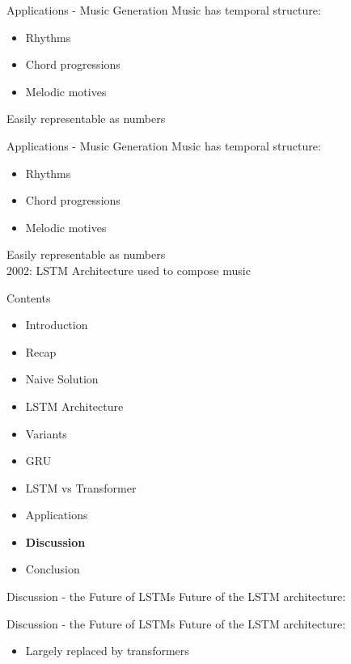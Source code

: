 \documentclass[10pt, aspectratio=169]{beamer}
\begin{document}
\begin{frame}[t]{Applications - Music Generation}
Music has temporal structure:
\begin{itemize}
    \item Rhythms
    \item Chord progressions
    \item Melodic motives
\end{itemize}
Easily representable as numbers
\end{frame}

\begin{frame}[t]{Applications - Music Generation}
Music has temporal structure:
\begin{itemize}
    \item Rhythms
    \item Chord progressions
    \item Melodic motives
\end{itemize}
Easily representable as numbers\\
2002: LSTM Architecture used to compose music
\end{frame}

\begin{frame}[t]{Contents}
\begin{itemize}
    \item Introduction
    \item Recap
    \item Naive Solution
    \item LSTM Architecture
    \item Variants
    \item GRU
    \item LSTM vs Transformer
    \item Applications
    \item \textbf{Discussion}
    \item Conclusion
\end{itemize}
\end{frame}
\begin{frame}[t]{Discussion - the Future of LSTMs}
Future of the LSTM architecture:
\end{frame}

\begin{frame}[t]{Discussion - the Future of LSTMs}
Future of the LSTM architecture:
\begin{itemize}
    \item Largely replaced by transformers
\end{itemize}
\end{frame}
\end{document}
